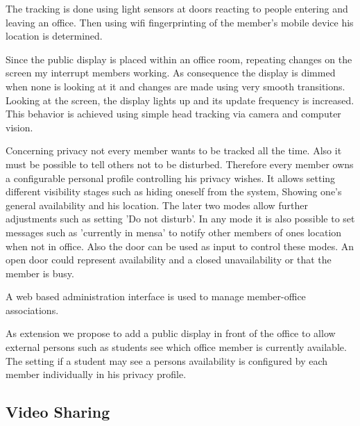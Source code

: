 The tracking is done using light sensors at doors reacting to people entering and leaving an office.
Then using wifi fingerprinting of the member's mobile device his location is determined.

Since the public display is placed within an office room, repeating changes on the screen my interrupt members working.
As consequence the display is dimmed when none is looking at it and changes are made using very smooth transitions.
Looking at the screen, the display lights up and its update frequency is increased.
This behavior is achieved using simple head tracking via camera and computer vision.

Concerning privacy not every member wants to be tracked all the time.
Also it must be possible to tell others not to be disturbed.
Therefore every member owns a configurable personal profile controlling his privacy wishes.
It allows setting different visibility stages such as hiding oneself from the system,
Showing one's general availability and his location.
The later two modes allow further adjustments such as setting 'Do not disturb'.
In any mode it is also possible to set messages such as 'currently in mensa' to notify other members of ones location when not in office.
Also the door can be used as input to control these modes.
An open door could represent availability and a closed unavailability or that the member is busy.

A web based administration interface is used to manage member-office associations.

As extension we propose to add a public display in front of the office to allow external persons such as students see which office member is currently available.
The setting if a student may see a persons availability is configured by each member individually in his privacy profile.



\subsection{Video Sharing}

